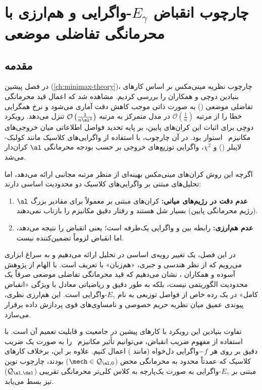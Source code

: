 \chapter{چارچوب انقباض $E_\gamma$-واگرایی و هم‌ارزی با محرمانگی تفاضلی موضعی}
\label{ch:egamma-ldp}

\section{مقدمه}
\label{sec:egamma:intro}

در فصل پیشین (\ref{ch:minimax-theory})، چارچوب نظریه مینی‌مکس بر اساس کارهای بنیادین دوچی و همکاران \cite{duchi2018} را بررسی کردیم. مشاهده شد که اعمال قید محرمانگی تفاضلی موضعی () به صورت ذاتی موجب کاهش دقت آماری می‌شود و نرخ همگرایی خطا را از مرتبه $\mathcal{O}\left( \frac{1}{n} \right)$ در مدل متمرکز به مرتبه $\mathcal{O}\left( \frac{1}{n\al^2} \right)$ تنزل می‌دهد. رویکرد دوچی برای اثبات این کران‌های پایین، بر پایه تحدید فواصل اطلاعاتی میان خروجی‌های مکانیزم \mech\ استوار بود. در آن چارچوب، با استفاده از واگرایی‌های کلاسیک مانند کولبک-لایبلر () و $\chi^2$، واگرایی توزیع‌های خروجی بر حسب بودجه محرمانگی $\al$ کران‌دار می‌شد.

اگرچه این روش کران‌های مینی‌مکس بهینه‌ای از منظر مرتبه مجانبی ارائه می‌دهد، اما تحلیل‌های مبتنی بر واگرایی‌های کلاسیک دو محدودیت اساسی دارند:
\begin{enumerate}
    \item \textbf{عدم دقت در رژیم‌های میانی:} کران‌های مبتنی بر  معمولاً برای مقادیر بزرگ $\al$ (رژیم محرمانگی پایین) بسیار شل هستند و رفتار دقیق مکانیزم را بازتاب نمی‌دهند.
    \item \textbf{عدم هم‌ارزی:} رابطه بین  و واگرایی  یک‌طرفه است؛ یعنی  انقباض  را نتیجه می‌دهد، اما انقباض  لزوماً تضمین‌کننده  نیست.
\end{enumerate}

در این فصل، یک تغییر رویه‌ی اساسی در تحلیل  ارائه می‌دهیم و به سراغ ابزاری می‌رویم که از نظر هندسی و جبری، «هم‌زبان» با تعریف  است. با الهام از پژوهش آسوده و همکاران \cite{Asoodeh2021}، نشان می‌دهیم که قید محرمانگی تفاضلی موضعی صرفاً یک محدودیت الگوریتمی نیست، بلکه به طور دقیق و ریاضیاتی معادل با ویژگی «انقباض کامل» در یک رده خاص از فواصل توزیعی به نام $E_\gamma$-واگرایی است. این هم‌ارزی نظری، پیوندی عمیق میان نظریه حریم خصوصی و نامساوی‌های قوی پردازش داده برقرار می‌سازد. 

تفاوت بنیادین این رویکرد با کارهای پیشین در جامعیت و قابلیت تعمیم آن است. با استفاده از مفهوم ضریب انقباض، می‌توانیم تأثیر مکانیزم \mech\ را به صورت یک ضریب دقیق بر روی هر $-f$واگرایی دل‌خواه (مانند ) اعمال کنیم. علاوه بر این، برخلاف کارهای کلاسیک که عمدتاً محدود به محرمانگی محض ($\mech \in \mathcal{Q}_{\al,0}$) بودند، چارچوب نوین مبتنی بر $E_\gamma$-واگرایی به صورت یک‌پارچه به کلاس کلی‌تر محرمانگی تقریبی ($\mathcal{Q}_{\al,\del}$) نیز بسط می‌یابد. 

